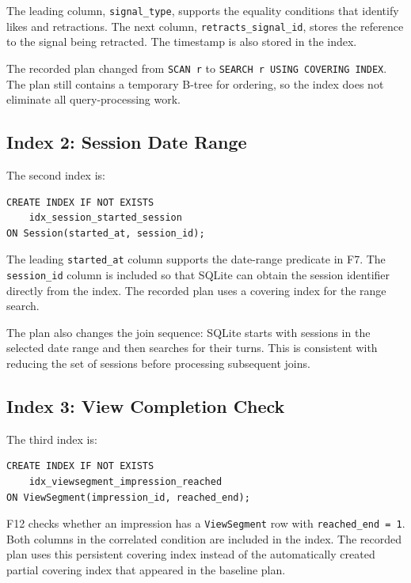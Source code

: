 \documentclass[11pt,a4paper]{article}
\begin{document}
The leading column, \texttt{signal\_type}, supports the equality
conditions that identify likes and retractions. The next column,
\texttt{retracts\_signal\_id}, stores the reference to the signal
being retracted. The timestamp is also stored in the index.

The recorded plan changed from \texttt{SCAN r} to
\texttt{SEARCH r USING COVERING INDEX}. The plan still contains a
temporary B-tree for ordering, so the index does not eliminate all
query-processing work.

\subsection{Index 2: Session Date Range}

The second index is:

\begin{lstlisting}[style=sqlstyle]
CREATE INDEX IF NOT EXISTS
    idx_session_started_session
ON Session(started_at, session_id);
\end{lstlisting}

The leading \texttt{started\_at} column supports the date-range
predicate in F7. The \texttt{session\_id} column is included so
that SQLite can obtain the session identifier directly from the
index. The recorded plan uses a covering index for the range search.

The plan also changes the join sequence: SQLite starts with
sessions in the selected date range and then searches for their
turns. This is consistent with reducing the set of sessions before
processing subsequent joins.

\subsection{Index 3: View Completion Check}

The third index is:

\begin{lstlisting}[style=sqlstyle]
CREATE INDEX IF NOT EXISTS
    idx_viewsegment_impression_reached
ON ViewSegment(impression_id, reached_end);
\end{lstlisting}

F12 checks whether an impression has a \texttt{ViewSegment} row
with \texttt{reached\_end = 1}. Both columns in the correlated
condition are included in the index. The recorded plan uses this
persistent covering index instead of the automatically created
partial covering index that appeared in the baseline plan.
\end{document}
